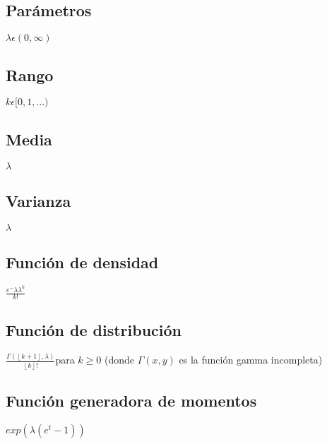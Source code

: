 \documentclass[es-lat]{article}
\begin{document}
\subsection{Parámetros}
$\lambda\epsilon(0, \infty)$ 

\subsection{Rango}
$k\epsilon [0,1,...)$

\subsection{Media}
$\lambda$

\subsection{Varianza}
$\lambda$

\subsection{Función de densidad}
$\frac{e^-{\lambda}\lambda^k}{k!}$

\subsection{Función de distribución}
$\frac{\Gamma (\left \lfloor k+1 \right \rfloor,\lambda)}{\left \lfloor k \right \rfloor!}$para $k\geq 0$ (donde $\Gamma (x,y)$ es la función gamma incompleta)

\subsection{Función generadora de momentos}
$exp(\lambda(e^t-1))$


\newpage
\end{document}

